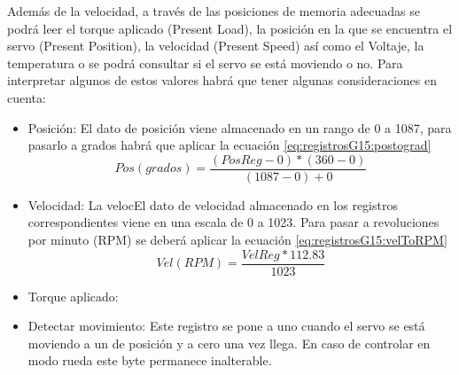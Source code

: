 		 
		Además de la velocidad, a través de las posiciones de memoria adecuadas se podrá leer el torque aplicado (Present Load), la posición en la que se encuentra el servo (Present Position), la velocidad (Present Speed) así como el Voltaje, la temperatura o se podrá consultar si el servo se está moviendo o no. Para interpretar algunos de estos valores habrá que tener algunas consideraciones en cuenta:
		\begin{itemize}
			\item Posición: El dato de posición viene almacenado en un rango de 0 a 1087, para pasarlo a grados habrá que aplicar la ecuación \ref{eq:registrosG15:postograd}
				\begin{equation}
				\label{eq:registrosG15:postograd}
					Pos(grados) = \dfrac{(PosReg - 0) * (360 - 0)}{(1087-0)+0}
				\end{equation}
			\item Velocidad: La velocEl dato de velocidad almacenado en los registros correspondientes viene en una escala de 0 a 1023. Para pasar a revoluciones por minuto (RPM) se deberá aplicar la ecuación \ref{eq:registrosG15:velToRPM}
			\begin{equation}
			\label{eq:registrosG15:velToRPM}
				Vel(RPM) = \dfrac{VelReg * 112.83}{1023}
			\end{equation}
			\item Torque aplicado: 
			\item Detectar movimiento: Este registro se pone a uno cuando el servo se está moviendo a un  de posición y a cero una vez llega. En caso de controlar en modo rueda este byte permanece inalterable.
		\end{itemize}
